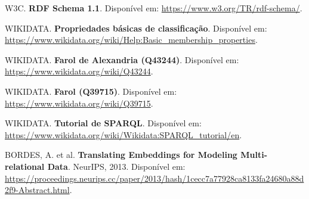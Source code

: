 \documentclass[12pt,a4paper]{article}
\begin{document}
\noindent [1] W3C. \textbf{RDF Schema 1.1}. Disponível em: \url{https://www.w3.org/TR/rdf-schema/}.

\noindent [2] WIKIDATA. \textbf{Propriedades básicas de classificação}. Disponível em: \url{https://www.wikidata.org/wiki/Help:Basic_membership_properties}.

\noindent [3] WIKIDATA. \textbf{Farol de Alexandria (Q43244)}. Disponível em: \url{https://www.wikidata.org/wiki/Q43244}.

\noindent [4] WIKIDATA. \textbf{Farol (Q39715)}. Disponível em: \url{https://www.wikidata.org/wiki/Q39715}.

\noindent [5] WIKIDATA. \textbf{Tutorial de SPARQL}. Disponível em: \url{https://www.wikidata.org/wiki/Wikidata:SPARQL_tutorial/en}.

\noindent [6] BORDES, A. et al. \textbf{Translating Embeddings for Modeling Multi-relational Data}. NeurIPS, 2013. Disponível em: \url{https://proceedings.neurips.cc/paper/2013/hash/1cecc7a77928ca8133fa24680a88d2f9-Abstract.html}.
\end{document}
